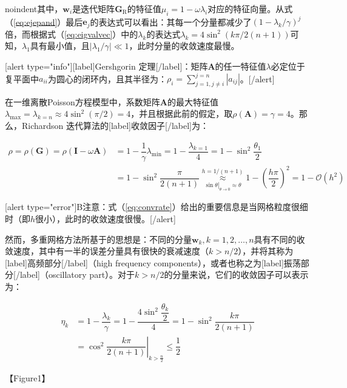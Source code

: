 \documentclass[12pt, UTF8, nofonts]{ctexart}
\begin{document}
noindent其中，$\boldsymbol{w}_i$是迭代矩阵$\boldsymbol{G}_{\mathrm{R}}$的特征值$\mu_i=1-\omega\lambda_i$对应的特征向量。从式（\ref{eq:ejepand}）最后$\boldsymbol{e}_j$的表达式可以看出：其每一个分量都减少了$(1-\lambda_k/\gamma)^j$倍，而根据式（\ref{eq:eigvalvec}）中的$\lambda_k$的表达式$\lambda_{k}=4\sin^2(k\pi/2(n+1))$可知，$\lambda_1$具有最小值，且$|\lambda_1/\gamma|\ll1$，此时分量的收敛速度最慢。

[alert type="info"][label]Gershgorin 定理[/label]：矩阵$\boldsymbol{A}$的任一特征值$\lambda$必定位于复平面中$a_{ii}$为圆心的闭环内，且其半径为：$\rho_i=\sum_{j=1,j\neq i}^{j=n}|a_{ij}|$。[/alert]

在一维离散Poisson方程模型中，系数矩阵$\boldsymbol{A}$的最大特征值$\lambda_{\max}=\lambda_{k=n}\approx 4\sin^2(\pi/2)=4$，并且根据此前的假定，取$\rho(\boldsymbol{A})=\gamma=4$。那么，Richardson 迭代算法的[label]收敛因子[/label]为：

\begin{equation}
  \label{eq:convrate}
  \begin{aligned}
    \rho = \rho(\boldsymbol{G}) = \rho(\boldsymbol{I}-\omega\boldsymbol{A}) &= 1 - \dfrac{1}{\gamma}\lambda_{\min} = 1 - \dfrac{\lambda_{k=1}}{4} = 1 - \sin^2\dfrac{\theta_1}{2} \\
    &= 1 - \sin^2\dfrac{\pi}{2(n+1)} \overset{h=1/(n+1)}{\underset{\left.\sin\theta\right|_{\theta \to 0} \approx \theta}{\approx}} 1 - \left(\dfrac{h\pi}{2}\right)^2 = 1 - \mathcal{O}(h^2)
  \end{aligned}
\end{equation}

[alert type="error"]B注意：式（\ref{eq:convrate}）给出的重要信息是当网格粒度很细时（即$h$很小），此时的收敛速度很慢。[/alert]

然而，多重网格方法所基于的思想是：不同的分量$\boldsymbol{w}_{k},k=1,2,\ldots,n$具有不同的收敛速度，其中有一半的误差分量具有很快的衰减速度（$k>n/2$），并将其称为[label]高频部分[/label]（high frequency components），或者也称之为[label]振荡部分[/label]（oscillatory part）。对于$k>n/2$的分量来说，它们的收敛因子可以表示为：

\[
  \begin{aligned}
    \eta_k &= 1-\dfrac{\lambda_k}{\gamma} = 1 - \dfrac{4\sin^2\dfrac{\theta_k}{2}}{4} = 1 - \sin^2\dfrac{k\pi}{2(n+1)} \\
    &= \left.\cos^2\dfrac{k\pi}{2(n+1)}\right|_{k>\frac{n}{2}} \leq \dfrac{1}{2}
  \end{aligned}
\]

【Figure1】
\end{document}
